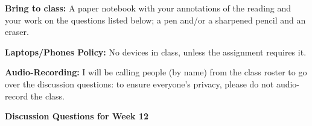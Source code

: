 \documentclass[12pt,dvipsnames]{article}
\newcommand*\circled[1]{\tikz[baseline=(char.base)]{%
		\node[shape=circle,fill=blue!20,draw,inner sep=2pt] (char) {#1};}}
\begin{document}
		
{\bfseries{Bring to class:} } A paper notebook with your annotations of the reading and your work on the questions listed below; a pen and/or a sharpened pencil and an eraser.

{\bfseries{Laptops/Phones Policy:}}  No devices in class, unless the assignment requires it.

{\bfseries{Audio-Recording:}} I will be calling people (by name) from the class roster to go over the discussion questions: to ensure everyone's privacy, please do not audio-record the class.


\begin{center}

{\large{\bfseries{Discussion Questions for Week 12} }}
\end{center}
		\renewcommand{\labelenumi}{(\arabic{enumi})}
\end{document}
